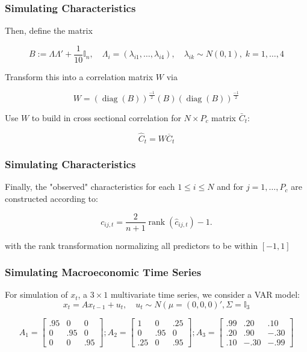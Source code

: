 \documentclass[]{beamer}
\begin{document}
\begin{frame}
\frametitle{Simulating Characteristics}
Then, define the matrix 

\begin{equation}
B:=\Lambda\Lambda' + \frac{1}{10}\mathbb{I}_{n}, \quad
\Lambda_i = (\lambda_{i1},\dots,\lambda_{i4}), \quad
\lambda_{ik}\sim N(0,1), \; k=1,\dots,4
\end{equation}

Transform this into a correlation matrix $W$ via

\begin{equation}
W = \left( \operatorname{diag}(B) \right) ^{\frac{-1}{2}}
(B)
\left( \operatorname{diag}(B) \right) ^{\frac{-1}{2}}
\end{equation}

Use $W$ to build in cross sectional correlation for $N\times P_{c}$ matrix $\bar{C}_t$:

\begin{equation}
\widehat{C}_{t}=W\overline{C}_{t}
\end{equation}
\end{frame}

\begin{frame}
\frametitle{Simulating Characteristics}

Finally, the "observed" characteristics for each $1\leq i\leq N$ and for $j=1, \dots, P_{c}$ are constructed according to:

\begin{equation}
c_{i j, t} = \frac{2}{n+1} \operatorname{rank}\left(\hat{c}_{i j, t}\right) - 1.
\end{equation}

with the rank transformation normalizing all predictors to be within $[-1, 1]$ 
\end{frame}

\begin{frame}
\frametitle{Simulating Macroeconomic Time Series}
For simulation of $x_{t}$, a $3 \times 1$ multivariate time series, we consider a VAR model:
\begin{equation*}
x_{t}=Ax_{t-1}+u_t, 
\quad u_t \sim N\left( \mu = (0, 0, 0)' , \Sigma = \mathbb{I}_{3}
\end{equation*}

\[
A_1 =
\begin{bmatrix}
.95 & 0 & 0 \\
0 & .95 & 0 \\
0 & 0 & .95
\end{bmatrix} ;
A_2 =
\begin{bmatrix}
1 & 0 & .25 \\
0 & .95 & 0 \\
.25 & 0 &.95
\end{bmatrix} ;
A_3 =
\begin{bmatrix}
.99 & .20 & .10 \\
.20 & .90 & -.30 \\
.10 & -.30 & -.99
\end{bmatrix}
\]
\end{frame}
\end{document}
